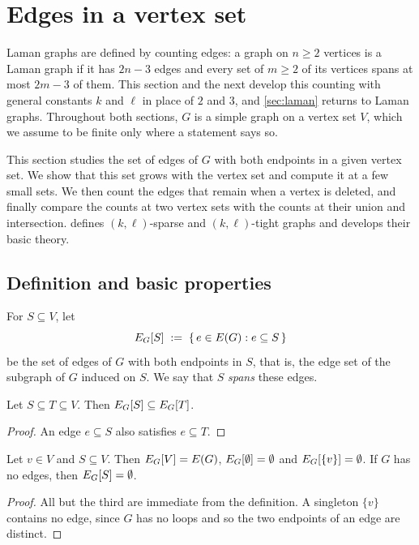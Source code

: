 \section{Edges in a vertex set}
\label{sec:edgesIn}

Laman graphs are defined by counting edges: a graph on $n \ge 2$
vertices is a Laman graph if it has $2n - 3$ edges and every set of
$m \ge 2$ of its vertices spans at most $2m - 3$ of them. This section
and the next develop this counting with general constants $k$ and
$\ell$ in place of $2$ and $3$, and \cref{sec:laman} returns to Laman
graphs. Throughout both sections, $G$ is a simple graph on a vertex
set $V$, which we assume to be finite only where a statement says so.

This section studies the set of edges of $G$ with both endpoints in a
given vertex set. We show that this set grows with the vertex set and
compute it at a few small sets. We then count the edges that remain
when a vertex is deleted, and finally compare the counts at two vertex
sets with the counts at their union and intersection.
 defines
$(k,\ell)$-sparse and $(k,\ell)$-tight graphs and develops their basic
theory.

\subsection{Definition and basic properties}

\begin{definition}
  \label{def:edgesIn}
  \leanok
  For $S \subseteq V$, let
  \[
    E_{G}[S] \;:=\; \{\,e \in E(G) : e \subseteq S\,\}
  \]
  be the set of edges of $G$ with both endpoints in $S$, that is, the
  edge set of the subgraph of $G$ induced on $S$. We say that $S$
  \emph{spans} these edges.
\end{definition}

\begin{lemma}[Monotonicity]
  \label{lem:edgesIn-mono}
  \leanok
  Let $S \subseteq T \subseteq V$. Then
  $E_{G}[S] \subseteq E_{G}[T]$.
\end{lemma}
\begin{proof}
  \leanok
  An edge $e \subseteq S$ also satisfies $e \subseteq T$.
\end{proof}

\begin{lemma}
  \label{lem:edgesIn-corners}
  \leanok
  Let $v \in V$ and $S \subseteq V$. Then $E_{G}[V] = E(G)$,
  $E_{G}[\emptyset] = \emptyset$ and $E_{G}[\{v\}] = \emptyset$.
  If $G$ has no edges, then $E_{G}[S] = \emptyset$.
\end{lemma}
\begin{proof}
  \leanok
  All but the third are immediate from the definition. A singleton
  $\{v\}$ contains no edge, since $G$ has no loops and so the two
  endpoints of an edge are distinct.
\end{proof}

